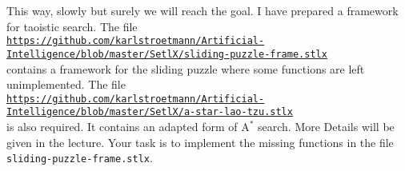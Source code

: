 This way, slowly but surely we will reach the goal.
I have prepared a framework for taoistic search.  The file
\\[0.2cm]
\hspace*{-0.8cm}
\href{https://github.com/karlstroetmann/Artificial-Intelligence/blob/master/SetlX/sliding-puzzle-frame.stlx}{\texttt{https://github.com/karlstroetmann/Artificial-Intelligence/blob/master/SetlX/sliding-puzzle-frame.stlx}}
\\[0.2cm]
contains a framework for the sliding puzzle where some functions are left unimplemented.  The file
\\[0.2cm]
\hspace*{-0.8cm}
\href{https://github.com/karlstroetmann/Artificial-Intelligence/blob/master/SetlX/a-star-lao-tzu.stlx}{\texttt{https://github.com/karlstroetmann/Artificial-Intelligence/blob/master/SetlX/a-star-lao-tzu.stlx}}
\\[0.2cm]
is also required.  It contains an adapted form of $\mathrm{A}^*$ search.  More Details will be given in the
lecture.  Your task is to implement the missing functions in the file \texttt{sliding-puzzle-frame.stlx}.
\eox

